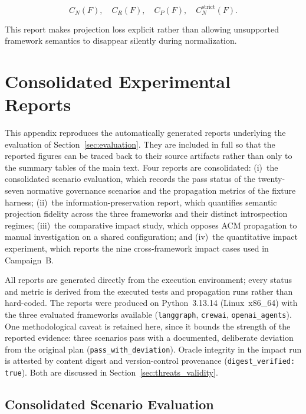 \documentclass[10pt]{article}
\begin{document}
\[
C_N(F),\quad
C_R(F),\quad
C_P(F),\quad
C_N^{\mathrm{strict}}(F).
\]

This report makes projection loss explicit rather than allowing unsupported
framework semantics to disappear silently during normalization.

\section{Consolidated Experimental Reports}
\label{app:experimental-reports}

This appendix reproduces the automatically generated reports underlying
the evaluation of Section~\ref{sec:evaluation}. They are included in full so that the reported figures can be traced back to their source
artifacts rather than only to the summary tables of the main text. Four
reports are consolidated: (i)~the consolidated scenario evaluation, which records the pass status of the twenty-seven normative governance
scenarios and the propagation metrics of the fixture harness;
(ii)~the information-preservation report, which quantifies semantic
projection fidelity across the three frameworks and their distinct
introspection regimes; (iii)~the comparative impact study, which opposes
ACM propagation to manual investigation on a shared configuration; and
(iv)~the quantitative impact experiment, which reports the nine
cross-framework impact cases used in Campaign~B.

All reports are generated directly from the execution environment; every
status and metric is derived from the executed tests and propagation
runs rather than hard-coded. The reports were produced on Python~3.13.14
(Linux~x86\_64) with the three evaluated frameworks available
(\texttt{langgraph}, \texttt{crewai}, \texttt{openai\_agents}). One methodological caveat is retained here, since it bounds the strength of the reported evidence: three scenarios pass with a documented, deliberate deviation from the original plan (\texttt{pass\_with\_deviation}). Oracle integrity in the impact run is attested by content digest and version-control provenance (\texttt{digest\_verified: true}). Both are discussed in
Section~\ref{sec:threats_validity}.

\subsection{Consolidated Scenario Evaluation}
\label{app:report-evaluation}
\end{document}
